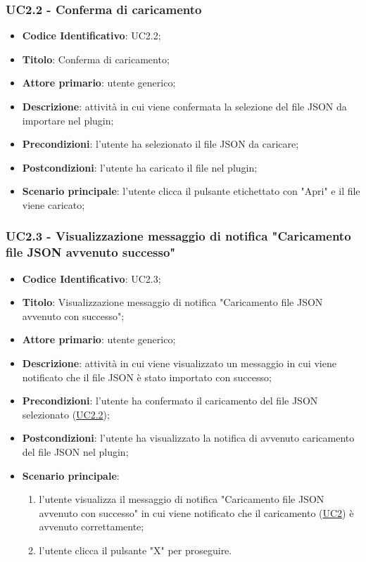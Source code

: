 		\label{par:UC2.2} 
		\subsubsection{UC2.2 - Conferma di caricamento}
		\begin{itemize}
			\item\textbf{Codice Identificativo}: UC2.2;
			\item\textbf{Titolo}: Conferma di caricamento;
			\item\textbf{Attore primario}: utente generico;
			\item\textbf{Descrizione}: attività in cui viene confermata la selezione del file JSON da importare nel plugin;
			\item\textbf{Precondizioni}: l'utente ha selezionato il file JSON da caricare;
			\item\textbf{Postcondizioni}: l'utente ha caricato il file nel plugin;
			\item\textbf{Scenario principale}: l'utente clicca il pulsante etichettato con "Apri" e il file viene caricato;
					
		\end{itemize}
		
		\label{par:UC2.3}
	\subsubsection{UC2.3 - Visualizzazione messaggio di notifica "Caricamento file JSON avvenuto successo"}
		\begin{itemize}
			\item\textbf{Codice Identificativo}: UC2.3;
			\item\textbf{Titolo}: Visualizzazione messaggio di notifica "Caricamento file JSON avvenuto con successo";
			\item\textbf{Attore primario}: utente generico;
			\item\textbf{Descrizione}: attività in cui viene visualizzato un messaggio in cui viene notificato che il file JSON è stato importato con successo;
			\item\textbf{Precondizioni}: l'utente ha confermato il caricamento del file JSON selezionato (\hyperref[par:UC2.2]{UC2.2});
			\item\textbf{Postcondizioni}: l'utente ha visualizzato la notifica di avvenuto caricamento del file JSON nel plugin;
			\item\textbf{Scenario principale}:
				\begin{enumerate}
					\item l'utente visualizza il messaggio di notifica "Caricamento file JSON avvenuto con successo" in cui viene notificato che il caricamento (\hyperref[par:UC2]{UC2}) è avvenuto correttamente;
					\item l'utente clicca il pulsante "X" per proseguire.		
				\end{enumerate}		
		\end{itemize}
		
